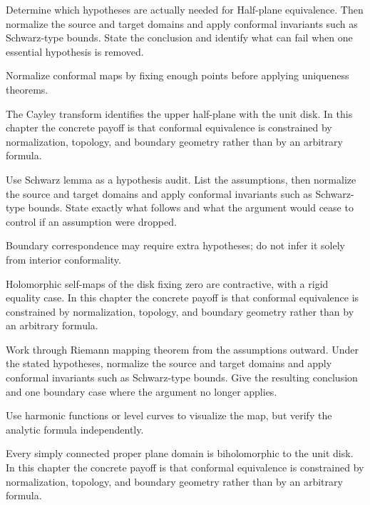 \begin{exercise}\label{exr:iv17-06}
Determine which hypotheses are actually needed for Half-plane equivalence. Then normalize the source and target domains and apply conformal invariants such as Schwarz-type bounds. State the conclusion and identify what can fail when one essential hypothesis is removed.
\end{exercise}
\begin{hint}
Normalize conformal maps by fixing enough points before applying uniqueness theorems.
\end{hint}
\begin{solution}
The Cayley transform identifies the upper half-plane with the unit disk. In this chapter the concrete payoff is that conformal equivalence is constrained by normalization, topology, and boundary geometry rather than by an arbitrary formula.
\end{solution}

\begin{exercise}\label{exr:iv17-07}
Use Schwarz lemma as a hypothesis audit. List the assumptions, then normalize the source and target domains and apply conformal invariants such as Schwarz-type bounds. State exactly what follows and what the argument would cease to control if an assumption were dropped.
\end{exercise}
\begin{hint}
Boundary correspondence may require extra hypotheses; do not infer it solely from interior conformality.
\end{hint}
\begin{solution}
Holomorphic self-maps of the disk fixing zero are contractive, with a rigid equality case. In this chapter the concrete payoff is that conformal equivalence is constrained by normalization, topology, and boundary geometry rather than by an arbitrary formula.
\end{solution}

\begin{exercise}\label{exr:iv17-08}
Work through Riemann mapping theorem from the assumptions outward. Under the stated hypotheses, normalize the source and target domains and apply conformal invariants such as Schwarz-type bounds. Give the resulting conclusion and one boundary case where the argument no longer applies.
\end{exercise}
\begin{hint}
Use harmonic functions or level curves to visualize the map, but verify the analytic formula independently.
\end{hint}
\begin{solution}
Every simply connected proper plane domain is biholomorphic to the unit disk. In this chapter the concrete payoff is that conformal equivalence is constrained by normalization, topology, and boundary geometry rather than by an arbitrary formula.
\end{solution}

